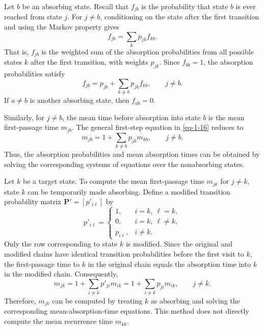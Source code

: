 \documentclass[../Note.tex]{subfiles}
\begin{document}
Let $b$ be an absorbing state. Recall that $f_{jb}$ is the probability that state $b$ is ever reached from state $j$. For $j\neq b$, conditioning on the state after the first transition and using the Markov property gives
\[
    f_{jb}=\sum_k p_{jk}f_{kb}.
\]
That is, $f_{jb}$ is the weighted sum of the absorption probabilities from all possible states $k$ after the first transition, with weights $p_{jk}$. Since $f_{bb}=1$, the absorption probabilities satisfy
\begin{equation}
    f_{jb}=p_{jb}+\sum_{k\neq b}p_{jk}f_{kb}, \qquad j\neq b.
\end{equation}
If $a\neq b$ is another absorbing state, then $f_{ab}=0$.

Similarly, for $j\neq b$, the mean time before absorption into state $b$ is the mean first-passage time $m_{jb}$. The general first-step equation in \eqref{eq-1-16} reduces to
\begin{equation}
    m_{jb}=1+\sum_{k\neq b}p_{jk}m_{kb},
    \qquad j\neq b.
\end{equation}
Thus, the absorption probabilities and mean absorption times can be obtained by solving the corresponding systems of equations over the nonabsorbing states.


\begin{remark}
    Let $k$ be a target state. To compute the mean first-passage time $m_{jk}$ for $j\neq k$, state $k$ can be temporarily made absorbing. Define a modified transition probability matrix $\mathbf{P}'=[p'_{i\ell}]$ by
    \[
        p'_{i\ell}
        =
        \begin{cases}
            1, & i=k,\ \ell=k,\\
            0, & i=k,\ \ell\neq k,\\
            p_{i\ell}, & i\neq k.
        \end{cases}
    \]
    Only the row corresponding to state $k$ is modified. Since the original and modified chains have identical transition probabilities before the first visit to $k$, the first-passage time to $k$ in the original chain equals the absorption time into $k$ in the modified chain. Consequently,
    \[
        m_{jk} =1+\sum_{i\neq k}p'_{ji}m_{ik} =1+\sum_{i\neq k}p_{ji}m_{ik}, \qquad j\neq k.
    \]
    Therefore, $m_{jk}$ can be computed by treating $k$ as absorbing and solving the corresponding mean-absorption-time equations. This method does not directly compute the mean recurrence time $m_{kk}$.
\end{remark}
\end{document}
